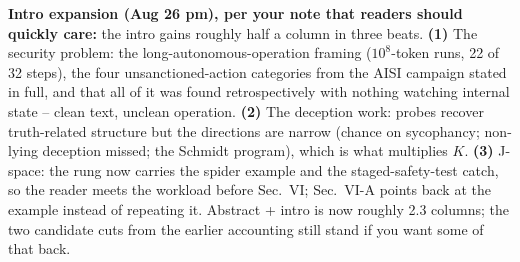 \documentclass[conference]{IEEEtran}
\begin{document}
{\begin{pnote}[aiviolet]
\textbf{Intro expansion (Aug 26 pm), per your note that readers should
quickly care:} the intro gains roughly half a column in three beats.
{\bf (1)} The security problem: the long-autonomous-operation framing
($10^{8}$-token runs, 22 of 32 steps), the four unsanctioned-action
categories from the AISI campaign stated in full, and that all of it
was found retrospectively with nothing watching internal state --
clean text, unclean operation. {\bf (2)} The deception work: probes
recover truth-related structure but the directions are narrow (chance
on sycophancy; non-lying deception missed; the Schmidt program), which
is what multiplies $K$. {\bf (3)} J-space: the rung now carries the
spider example and the staged-safety-test catch, so the reader meets
the workload before Sec.~VI; Sec.~VI-A points back at the example
instead of repeating it. Abstract + intro is now roughly 2.3 columns;
the two candidate cuts from the earlier accounting still stand if you
want some of that back.


\end{pnote}}
\end{document}
